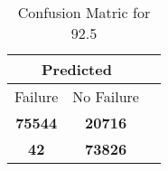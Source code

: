 \begin{table}[] 
\caption{Confusion Matric for 92.5} 
\label{Table: Prediction Accuracy-DMD92.5OnlySunEKF-combinationReflectionEKF-top2-Reflection} 
\centering 
\begin{tabular} 
 {@{}ccc@{}} 
\toprule 
\multicolumn{2}{c}{\textbf{Predicted}}
 \\ \midrule 
\multicolumn{1}{|c|}{Failure} & 
\multicolumn{1}{c|}{No Failure}
 \\ \midrule 
\multicolumn{1}{|c|}{\color{green}\textbf{75544}} & 
\multicolumn{1}{c|}{\color{red}\textbf{20716}}
 \\ \midrule 
\multicolumn{1}{|c|}{\color{red}\textbf{42}} & 
\multicolumn{1}{c|}{\color{green}\textbf{73826}}
 \\ \bottomrule 
\end{tabular} 
\end{table} 
